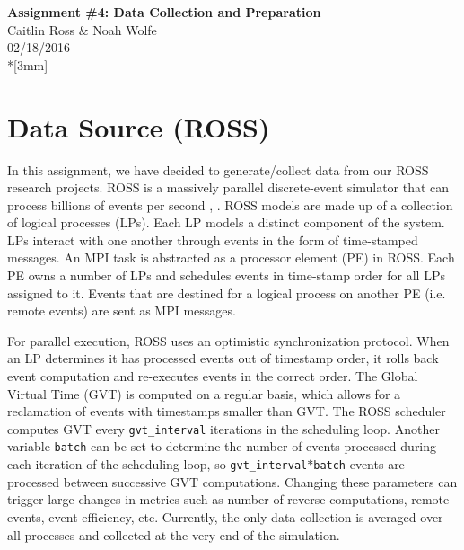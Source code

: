 \documentclass[12pt]{article}
\begin{document}
\thispagestyle{empty}
\begin{center}
{\Large\bf Assignment \#4: Data Collection and Preparation}
\vspace{3mm}
\\Caitlin Ross \& Noah Wolfe
\\02/18/2016
\\*[3mm]
\end{center}
\section{Data Source (ROSS)}
In this assignment, we have decided to generate/collect data from our ROSS research projects. 
ROSS is a massively parallel discrete-event simulator that
can process billions of events per second \cite{Holder}, \cite{Bauer}. ROSS
models are made up of a collection of logical processes (LPs).
Each LP models a distinct component of the system. LPs
interact with one another through events in the form of time-stamped messages. An MPI task is abstracted as a processor
element (PE) in ROSS. Each PE owns a number of LPs and
schedules events in time-stamp order for all LPs assigned to
it. Events that are destined for a logical process on another
PE (i.e. remote events) are sent as MPI messages. 

For parallel execution, ROSS uses an optimistic synchronization protocol.  When an LP determines it has processed events out of timestamp order, it rolls back event computation and re-executes events in the correct order.  The Global Virtual Time (GVT) is computed on a regular basis, which allows for a reclamation of events with timestamps smaller than GVT.  The ROSS scheduler computes GVT every \texttt{gvt\_interval} iterations in the scheduling loop.  Another variable \texttt{batch} can be set to determine the number of events processed during each iteration of the scheduling loop, so \texttt{gvt\_interval$*$batch} events are processed between successive GVT computations.  Changing these parameters can trigger large changes in metrics such as number of reverse computations, remote events, event efficiency, etc. Currently, the only data collection is averaged over all processes and collected at the very end of the simulation. 
\end{document}
